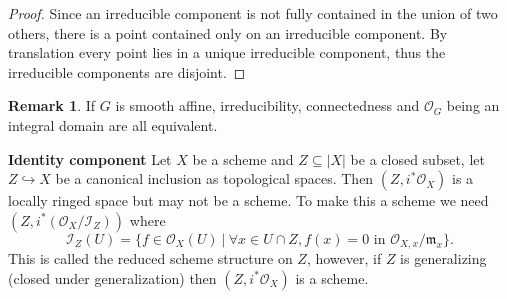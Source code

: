 \documentclass[10pt]{article}
\numberwithin{equation}{section}
\theoremstyle{definition}
\newtheorem{remark}{Remark}[section]
\newcommand{\m}[0]{\mathfrak{m}}
\newcommand{\sep}[0]{\:|\:}
\newcommand{\ab}[1]{\vert #1 \vert}
\newcommand{\cO}[0]{\mathcal{O}}
\begin{document}
\begin{proof}
    Since an irreducible component is not fully contained in the union of two others, there is a point contained only on an irreducible component.
    By translation every point lies in a unique irreducible component, thus the irreducible components are disjoint.
\end{proof}
\begin{remark}
    If $G$ is smooth affine, irreducibility, connectedness and $\cO_G$ being an integral domain are all equivalent.
\end{remark}
\par\textbf{Identity component}
Let $X$ be a scheme and $Z\subseteq\ab{X}$ be a closed subset, let $Z\hookrightarrow X$ be a canonical inclusion as topological spaces. Then $(Z,i^*\cO_X)$ is a locally ringed space but may not be a scheme.
To make this a scheme we need $(Z,i^*(\cO_X/\mathcal{I}_Z))$ where 
\begin{equation*}
    \mathcal{I}_Z(U) = \{f\in\cO_X(U)\sep \forall x\in U\cap Z, f(x) = 0 \text{ in $\cO_{X,x}/\m_x$}\}.
\end{equation*}
This is called the reduced scheme structure on $Z$, however, if $Z$ is generalizing (closed under generalization) then $(Z,i^*\cO_X)$ is a scheme.
\end{document}
